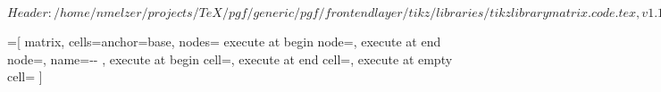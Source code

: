 %
%
%

\ProvidesFileRCS[v\pgfversion] $Header: /home/nmelzer/projects/TeX/pgf/generic/pgf/frontendlayer/tikz/libraries/tikzlibrarymatrix.code.tex,v 1.1 2008/01/09 17:57:16 tantau Exp $



=[%
   matrix,%
   cells={anchor=base},%
   nodes={%
     execute at begin node=,%
     execute at end node=,
     name=\tikzmatrixname-\the\pgfmatrixcurrentrow-\the\pgfmatrixcurrentcolumn%
   },
   execute at begin cell=\tikz@lib@matrix@start@cell,%
   execute at end cell=\tikz@lib@matrix@end@cell,%
   execute at empty cell=\tikz@lib@matrix@empty@cell
]

\def\tikz@lib@matrix@empty@cell{\iftikz@lib@matrix@empty\node{};\fi}

\newif\iftikz@lib@matrix@plain

\def\tikz@lib@matrix@start@cell{%
  \pgfutil@ifnextchar|{\tikz@lib@matrix@with@options}{\tikz@lib@matrix@normal@start@cell}}

\def\tikz@lib@matrix@with@options|#1|{\tikz@lib@matrix@plainfalse\node#1\bgroup\tikz@lib@matrix@startup}


\def\tikz@lib@matrix@normal@start@cell{\pgfutil@ifnextchar\let{\tikz@lib@matrix@check}{\tikz@lib@matrix@plainfalse\node\bgroup\tikz@lib@matrix@startup}}%

\def\tikz@lib@matrix@check#1{%
  \pgfutil@ifnextchar\tikz@signal@path{\tikz@lib@matrix@plaintrue\let}{\tikz@lib@matrix@plainfalse\node\bgroup\tikz@lib@matrix@startup\let}%
}
  
\def\tikz@lib@matrix@end@cell{%
  \iftikz@lib@matrix@plain%
  \else%
    \expandafter\egroup\expandafter;%
  \fi%
}

\def\tikz@lib@matrix@startup{%
  \pgfutil@ifnextchar\bgroup{%
    \let\tikz@lib@matrix@saved@eol=\\%
    \let\\=\pgfmatrixendrow%
    \afterassignment\tikz@lib@matrix@smuggle%
    \let\tikz@next}
  {\let\\=\pgfmatrixendrow}%
}
\def\tikz@lib@matrix@smuggle{%
  \bgroup%
  \let\\=\tikz@lib@matrix@saved@eol%
}



